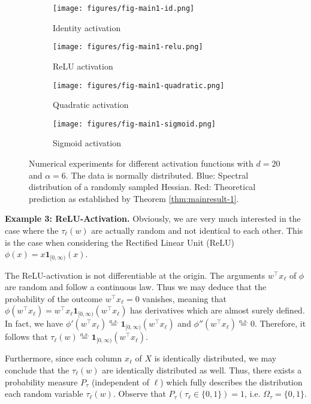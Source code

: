 \documentclass{article}
\begin{document}
\begin{figure}[ht]
    \centering
    \begin{subfigure}{0.4\textwidth}
        \texttt{[image: figures/fig-main1-id.png]}
        \caption{Identity activation}
    \end{subfigure}
    \hfill
    \begin{subfigure}{0.4\textwidth}
        \texttt{[image: figures/fig-main1-relu.png]}
        \caption{ReLU activation}
    \end{subfigure}
    \hfill
    \begin{subfigure}{0.4\textwidth}
        \texttt{[image: figures/fig-main1-quadratic.png]}
        \caption{Quadratic activation}
    \end{subfigure}
    \hfill
    \begin{subfigure}{0.4\textwidth}
        \texttt{[image: figures/fig-main1-sigmoid.png]}
        \caption{Sigmoid activation}
    \end{subfigure}
    
    \caption{Numerical experiments for different activation functions with $d=20$ and $\alpha=6$. The data is normally distributed. Blue: Spectral distribution of a randomly sampled Hessian. Red: Theoretical prediction as established by Theorem \ref{thm:mainresult-1}.}
    \label{fig:main}
\end{figure}
\bigskip
\bigskip
\noindent
\textbf{Example 3: ReLU-Activation.} Obviously, we are very much interested in the case where the $\tau_\ell(w)$ are actually random and not identical to each other. This is the case when considering the Rectified Linear Unit (ReLU) $\phi(x)=x\mathbf{1}_{[0,\infty)}(x)$.
\par
The ReLU-activation is not differentiable at the origin. The arguments $w^\top x_\ell$ of $\phi$ are random and follow a continuous law. Thus we may deduce that the probability of the outcome $w^\top x_\ell=0$ vanishes, meaning that $\phi(w^\top x_\ell)=w^\top x_\ell\mathbf{1}_{[0,\infty)}(w^\top x_\ell)$ has derivatives which are almost surely defined. In fact, we have $\phi'(w^\top x_\ell)\stackrel{a.s.}{=}\mathbf{1}_{[0,\infty)}(w^\top x_\ell)$ and $\phi''(w^\top x_\ell)\stackrel{a.s.}{=}0$. Therefore, it follows that $\tau_\ell(w)\stackrel{a.s.}{=}\mathbf{1}_{[0,\infty)}(w^\top x_\ell)$.
\par
Furthermore, since each column $x_\ell$ of $X$ is identically distributed, we may conclude that the $\tau_\ell(w)$ are identically distributed as well. Thus, there exists a probability measure $P_\tau$ (independent of $\ell$) which fully describes the distribution each random variable $\tau_\ell(w)$. Observe that $P_\tau(\tau_\ell\in\{0,1\})=1$, i.e. $\Omega_\tau=\{0,1\}$.
\end{document}
